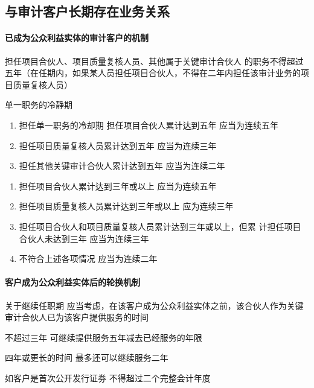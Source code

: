 \documentclass[UTF8,12pt]{ctexart}
\numberwithin{equation}{section} %
\numberwithin{figure}{section}
\numberwithin{table}{section}
\begin{document}
	\subsection{与审计客户长期存在业务关系}
	\paragraph{已成为公众利益实体的审计客户的机制}
	担任项目合伙人、项目质量复核人员、其他属于关键审计合伙人 的职务不得超过五年（在任期内，如果某人员担任项目合伙人，不得在二年内担任该审计业务的项目质量复核人员）
		
	单一职务的冷静期
	\begin{enumerate}
		\item 担任单一职务的冷却期 担任项目合伙人累计达到五年 应当为连续五年
		
		\item 担任项目质量复核人员累计达到五年 应当为连续三年
		
		\item 担任其他关键审计合伙人累计达到五年 应当为连续二年
	\end{enumerate}
	
	\begin{enumerate}
		\item 担任项目合伙人累计达到三年或以上  应当为连续五年
		
		\item 担任项目质量复核人员累计达到三年或以上    应为连续三年 
		
		\item 担任项目合伙人和项目质量复核人员累计达到三年或以上，但累 计担任项目合伙人未达到三年    应当为连续三年 
		
		\item 不符合上述各项情况    应当为连续二年
	\end{enumerate}
	
	
	\paragraph{客户成为公众利益实体后的轮换机制}
	关于继续任职期 应当考虑，在该客户成为公众利益实体之前，该合伙人作为关键审计合伙人已为该客户提供服务的时间
	
	不超过三年  可继续提供服务五年减去已经服务的年限
	
	四年或更长的时间  最多还可以继续服务二年
	
	如客户是首次公开发行证券  不得超过二个完整会计年度
	
\end{document}
